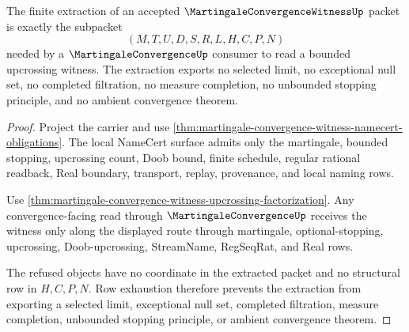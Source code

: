 \begin{theorem}
\label{thm:martingale-convergence-witness-finite-extraction}
The finite extraction of an accepted $\MartingaleConvergenceWitnessUp$ packet is exactly the subpacket
$$
(M,T,U,D,S,R,L,H,C,P,N)
$$
needed by a $\MartingaleConvergenceUp$ consumer to read a bounded upcrossing witness. The extraction exports no selected limit, no exceptional null set, no completed filtration, no measure completion, no unbounded stopping principle, and no ambient convergence theorem.
\end{theorem}
\begin{proof}
Project the carrier and use \autoref{thm:martingale-convergence-witness-namecert-obligations}. The local NameCert surface admits only the martingale, bounded stopping, upcrossing count, Doob bound, finite schedule, regular rational readback, Real boundary, transport, replay, provenance, and local naming rows.

Use \autoref{thm:martingale-convergence-witness-upcrossing-factorization}. Any convergence-facing read through $\MartingaleConvergenceUp$ receives the witness only along the displayed route through martingale, optional-stopping, upcrossing, Doob-upcrossing, StreamName, RegSeqRat, and Real rows.

The refused objects have no coordinate in the extracted packet and no structural row in $H,C,P,N$. Row exhaustion therefore prevents the extraction from exporting a selected limit, exceptional null set, completed filtration, measure completion, unbounded stopping principle, or ambient convergence theorem.
\end{proof}


\begin{closurestatus}{\MartingaleConvergenceWitnessUp}
  \theoryclosure{\seedClosure}
  \formalstatus{\formalTargetV}
\end{closurestatus}
